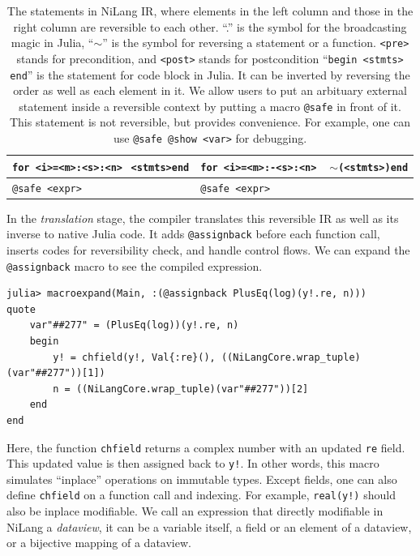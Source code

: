 \documentclass{article}
\newcommand{\<}{\langle}
\renewcommand{\>}{\rangle}
\newcommand{\cquad}{{{ }_{\quad}}}
\theoremstyle{definition}\newtheorem{definition}{\textit{Definition}}
\begin{document}
\begin{table}[h!]
\begin{minipage}{0.8\columnwidth}
{\begin{tabularx}{\textwidth}{X X}
            \hline
            \texttt{for <i>=<m>:<s>:<n>}\newline $\cquad$\texttt{<stmts>}\newline \texttt{end} & \texttt{for <i>=<m>:-<s>:<n>}\newline $\cquad$ \texttt{$\sim$(<stmts>)}\newline \texttt{end}\\
            \hline
            \texttt{@safe <expr>} & \texttt{@safe <expr>}\\
            \bottomrule
        \end{tabularx}
    }
    \caption{The statements in NiLang IR, where elements in the left column and those in the right column are reversible to each other.
    ``.'' is the symbol for the broadcasting magic in Julia,
    ``$\sim$'' is the symbol for reversing a statement or a function.
    \texttt{<pre>} stands for precondition, and \texttt{<post>} stands for postcondition
``\texttt{begin <stmts> end}'' is the statement for code block in Julia.
It can be inverted by reversing the order as well as each element in it.
We allow users to put an arbituary external statement inside a reversible context by putting a macro \texttt{@safe} in front of it.
This statement is not reversible, but provides convenience.
For example, one can use \texttt{@safe @show <var>} for debugging.
}\label{tbl:revstatements}
\end{minipage}
\end{table}

In the \textit{translation} stage, the compiler translates this reversible IR as well as its inverse to native Julia code. It adds \texttt{@assignback} before each function call, inserts codes for reversibility check, and handle control flows.
We can expand the \texttt{@assignback} macro to see the compiled expression.

\begin{minipage}{.88\columnwidth}
\begin{lstlisting}
julia> macroexpand(Main, :(@assignback PlusEq(log)(y!.re, n)))
quote
    var"##277" = (PlusEq(log))(y!.re, n)
    begin
        y! = chfield(y!, Val{:re}(), ((NiLangCore.wrap_tuple)(var"##277"))[1])
        n = ((NiLangCore.wrap_tuple)(var"##277"))[2]
    end
end
\end{lstlisting}
\end{minipage}

Here, the function \texttt{chfield} returns a complex number with an updated \texttt{re} field. This updated value is then assigned back to \texttt{y!}.
In other words, this macro simulates ``inplace'' operations on immutable types.
Except fields, one can also define \texttt{chfield} on a function call and indexing. For example, \texttt{real(y!)} should also be inplace modifiable. We call an expression that directly modifiable in NiLang a \textit{dataview}, it can be a variable itself, a field or an element of a dataview, or a bijective mapping of a dataview.
\end{document}
